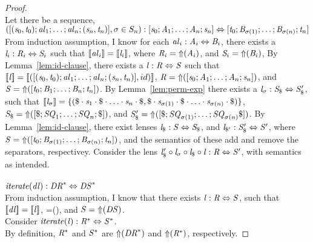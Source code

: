 \begin{lemma}
\begin{proof}
\\
Let there be a sequence, $([(\mathit{s}_0,\mathit{t}_0);\mathit{al}_1;\ldots;\mathit{al}_n;(\mathit{s}_n,\mathit{t}_n)],\sigma \in S_n) : [\mathit{s}_0 ; \mathit{A}_1 ; \ldots ; \mathit{A}_n ; \mathit{s}_n] \Leftrightarrow [\mathit{t}_0; \mathit{B}_{\sigma(1)} ; \ldots ; \mathit{B}_{\sigma(n)} ; \mathit{t}_n]$
From induction assumption, I know for each $\mathit{al}_i : \mathit{A}_i \Leftrightarrow \mathit{B}_i$, there exists a $\mathit{l}_i : \mathit{R}_i \Leftrightarrow \mathit{S}_i$ such that $[ \! [\mathit{al}_i] \! ]=[ \! [\mathit{l}_i] \! ]$, where $\mathit{R}_i=\mathit{\Uparrow}(\mathit{A}_i)$, and $\mathit{S}_i=\mathit{\Uparrow}(\mathit{B}_i)$,
By Lemma~\ref{lem:id-clause}, there exists a $\mathit{l} : \mathit{R} \Leftrightarrow \mathit{S}$ such that $[ \! [\mathit{l}] \! ]=[ \! [([(\mathit{s}_0,\mathit{t}_0);\mathit{al}_1;\ldots;\mathit{al}_n;(\mathit{s}_n,\mathit{t}_n)],id)] \! ]$,
$\mathit{R}=\mathit{\Uparrow}([\mathit{s}_0;\mathit{A}_1;\ldots;\mathit{A}_n;\mathit{s}_n])$, and
$\mathit{S}=\mathit{\Uparrow}([\mathit{t}_0;\mathit{B}_1;\ldots;\mathit{B}_n;\mathit{t}_n])$.
By Lemma~\ref{lem:perm-exp} there exists a $\mathit{l}_{\sigma} : \mathit{S}_{\$} \Leftrightarrow \mathit{S}_{\$}'$,
such that $[ \! [\mathit{l}_{\sigma}] \! ]=\{(\$\cdot\mathit{s}_1\cdot\$\cdot\ldots\cdot\mathit{s}_n\cdot\$,\$\cdot\mathit{s}_{\sigma(1)}\cdot\$\cdot\ldots\cdot\mathit{s}_{\sigma(n)}\cdot\$)\}$,
$\mathit{S}_{\$}=\mathit{\Uparrow}([\$;\mathit{SQ}_1;\ldots;\mathit{SQ}_n;\$])$, and
$\mathit{S}_{\$}'=\mathit{\Uparrow}([\$;\mathit{SQ}_{\sigma(1)};\ldots;\mathit{SQ}_{\sigma(n)}\$])$.
By Lemma~\ref{lem:id-clause}, there exist lenses $\mathit{l}_{\$} : \mathit{S} \Leftrightarrow \mathit{S}_{\$}$, and
$\mathit{l}_{\$'} : \mathit{S}_{\$}' \Leftrightarrow \mathit{S}'$, where
$\mathit{S}=\mathit{\Uparrow}([\mathit{t}_0; \mathit{B}_{\sigma(1)} ; \ldots ; \mathit{B}_{\sigma(n)} ; \mathit{t}_n])$, and the semantics of these add and remove the separators, respectivey.
Consider the lens $\mathit{l}_{\$}' \circ \mathit{l}_{\sigma} \circ \mathit{l}_{\$} \circ \mathit{l} : \mathit{R} \Leftrightarrow \mathit{S}'$, with semantics as intended.\\
\\
$\mathit{iterate(\mathit{dl})} : \mathit{DR}^* \Leftrightarrow \mathit{DS}^*$\\
From induction assumption, I know that there exists $\mathit{l} : \mathit{R} \Leftrightarrow \mathit{S}$, such that
$[ \! [\mathit{dl}] \! ]=[ \! [\mathit{l}] \! ]$,
\Regex=\ToRegex(\DNFRegex), and
$\mathit{S}=\mathit{\Uparrow}(\mathit{DS})$.\\
Consider $\mathit{iterate(\mathit{l})} : \mathit{R}^* \Leftrightarrow \mathit{S}^*$.\\
By definition, $\mathit{R}^*$ and $\mathit{S}^*$ are $\mathit{\Uparrow}(\mathit{DR}^*)$
and $\mathit{\Uparrow}(\mathit{R}^*)$, respectively.


\end{proof}
\end{lemma}
